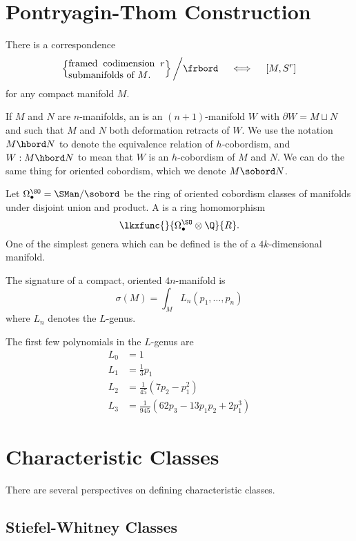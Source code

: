 \chapter{Pontryagin-Thom Construction}

\begin{theorem}
	There is a correspondence
	\[
	\left\{ \parbox{10em}{framed codimension $r$ submanifolds of $M$.}\right\} 
	\bigg/
	\frbord
	\quad\iff\quad
	[M, S^r]
	\]
	for any compact manifold $M$.
\end{theorem}

If $M$ and $N$ are $n$-manifolds, an  is an $(n+1)$-manifold $W$ with $\partial W = M\sqcup N$ and such that $M$ and $N$ both deformation retracts of $W$. We use the notation $M \hbord N$ to denote the equivalence relation of $h$-cobordism, and $W : M \hbord N$ to mean that $W$ is an $h$-cobordism of $M$ and $N$.
We can do the same thing for oriented cobordism, which we denote $M \sobord N$.

Let $\Omega^\SO_\bullet = \SMan / \sobord$ be the ring of oriented cobordism classes of manifolds under disjoint union and product. A  is a ring homomorphism
\[
	\lkxfunc{}{\Omega_\bullet^\SO\otimes \Q}{R}.
\]
One of the simplest genera which can be defined is the  of a $4k$-dimensional manifold.
\begin{theorem}
	The signature of a compact, oriented $4n$-manifold is
	\[
		\sigma(M) = \int_M L_n(p_1,\ldots, p_n)
	\]
	where $L_n$ denotes the $L$-genus.
\end{theorem}

The first few polynomials in the $L$-genus are
\[
		\begin{aligned}
			L_0 &= 1\\
			L_1 &= \frac{1}{3}p_1\\
			L_2 &= \frac{1}{45}(7p_2 - p_1^2)\\
			L_3 &= \frac{1}{945}(62p_3 - 13p_1p_2 + 2p_1^3)
		\end{aligned}
\]

\chapter{Characteristic Classes}

There are several perspectives on defining characteristic classes.

\section{Stiefel-Whitney Classes}

